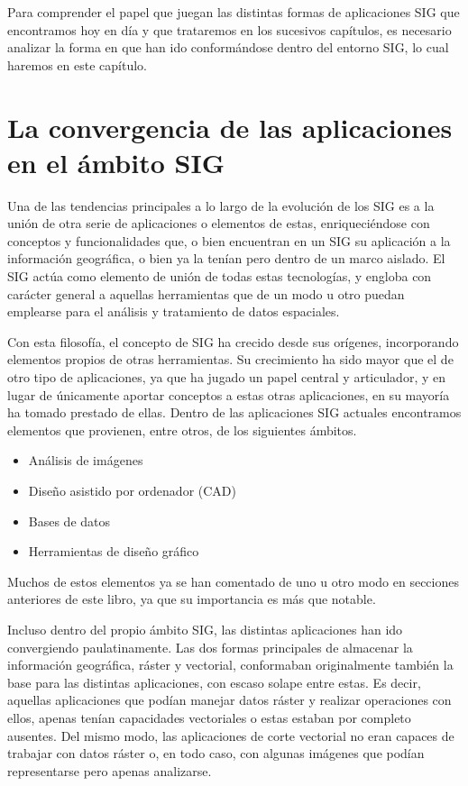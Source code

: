 Para comprender el papel que juegan las distintas formas de aplicaciones SIG que encontramos hoy en día y que trataremos en los sucesivos capítulos, es necesario analizar la forma en que han ido conformándose dentro del entorno SIG, lo cual haremos en este capítulo.

\section{La convergencia de las aplicaciones en el ámbito SIG}

Una de las tendencias principales a lo largo de la evolución de los SIG es a la unión de otra serie de aplicaciones o elementos de estas, enriqueciéndose con conceptos y funcionalidades que, o bien encuentran en un SIG su aplicación a la información geográfica, o bien ya la tenían pero dentro de un marco aislado. El SIG actúa como elemento de unión de todas estas tecnologías, y engloba con carácter general a aquellas herramientas que de un modo u otro puedan emplearse para el análisis y tratamiento de datos espaciales.

Con esta filosofía, el concepto de SIG ha crecido desde sus orígenes, incorporando elementos propios de otras herramientas. Su crecimiento ha sido mayor que el de otro tipo de aplicaciones, ya que ha jugado un papel central y articulador, y en lugar de únicamente aportar conceptos a estas otras aplicaciones, en su mayoría ha tomado prestado de ellas. Dentro de las aplicaciones SIG actuales encontramos elementos que provienen, entre otros, de los siguientes ámbitos.

\begin{itemize}
	\item Análisis de imágenes
	\item Diseño asistido por ordenador (CAD)
	\item Bases de datos
	\item Herramientas de diseño gráfico	
\end{itemize}

Muchos de estos elementos ya se han comentado de uno u otro modo en secciones anteriores de este libro, ya que su importancia es más que notable.

Incluso dentro del propio ámbito SIG, las distintas aplicaciones han ido convergiendo paulatinamente. Las dos formas principales de almacenar la información geográfica, ráster y vectorial, conformaban originalmente también la base para las distintas aplicaciones, con escaso solape entre estas. Es decir, aquellas aplicaciones que podían manejar datos ráster y realizar operaciones con ellos, apenas tenían capacidades vectoriales o estas estaban por completo ausentes. Del mismo modo, las aplicaciones de corte vectorial no eran capaces de trabajar con datos ráster o, en todo caso, con algunas imágenes que podían representarse pero apenas analizarse.

